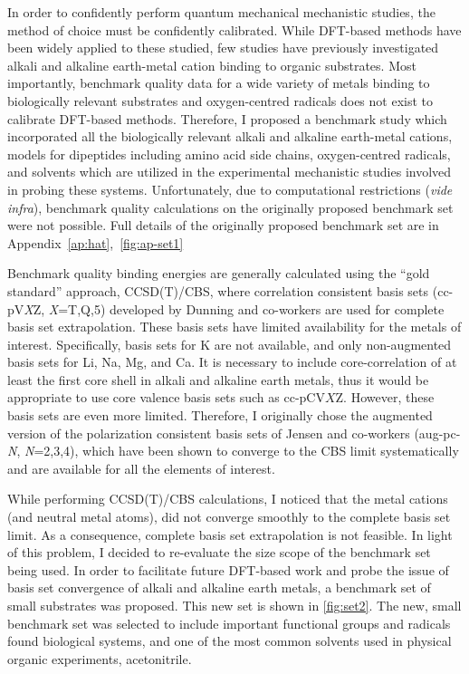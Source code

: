 In order to confidently perform quantum mechanical mechanistic studies, the method of choice must be confidently calibrated. While DFT-based methods have been widely applied to these studied, few studies have previously investigated alkali and alkaline earth-metal cation binding to organic substrates.\cite{Corral2003, Suarez2011, Siu2001, Baldauf2013} Most importantly, benchmark quality data for a wide variety of metals binding to biologically relevant substrates and oxygen-centred radicals does not exist to calibrate DFT-based methods. Therefore, I proposed a benchmark study which incorporated all the biologically relevant alkali and alkaline earth-metal cations, models for dipeptides including amino acid side chains, oxygen-centred radicals, and solvents which are utilized in the experimental mechanistic studies involved in probing these systems. Unfortunately, due to computational restrictions (\emph{vide infra}), benchmark quality calculations on the originally proposed benchmark set were not possible. Full details of the originally proposed benchmark set are in Appendix~\ref{ap:hat},~\ref{fig:ap-set1}

Benchmark quality binding energies are generally calculated using the ``gold standard'' approach, CCSD(T)/CBS, where correlation consistent basis sets\cite{Marshall2011, Rezac2013} (cc-pV\emph{X}Z, \emph{X}=T,Q,5) developed by Dunning an\cite{Vydrov2006, Vydrov2006a}d co-workers are used for complete basis set extrapolation. These basis sets have limited availability for the metals of interest. Specifically, basis sets for K are not available, and only non-augmented basis sets for Li, Na, Mg, and Ca. It is necessary to include core-correlation of at least the first core shell in alkali and alkaline earth metals, thus it would be appropriate to use core valence basis sets such as cc-pCV$X$Z.\cite{Peterson2002} However, these basis sets are even more limited. Therefore, I originally chose the augmented version of the polarization consistent basis sets of Jensen and co-workers\cite{Jensen2001, Jensen2002, Jensen2002a, Jensen2003}  (aug-pc-\emph{N}, \emph{N}=2,3,4), which have been shown to converge to the CBS limit systematically\cite{Kupka2007} and are available for all the elements of interest.

While performing CCSD(T)/CBS calculations, I noticed that the metal cations (and neutral metal atoms), did not converge smoothly to the complete basis set limit. As a consequence, complete basis set extrapolation is not feasible. In light of this problem, I decided to re-evaluate the size scope of the benchmark set being used. In order to facilitate future DFT-based work and probe the issue of basis set convergence of alkali and alkaline earth metals, a benchmark set of small substrates was proposed. This new set is shown in \ref{fig:set2}. The new, small benchmark set was selected to include important functional groups and radicals found biological systems, and one of the most common solvents used in physical organic experiments, acetonitrile.

